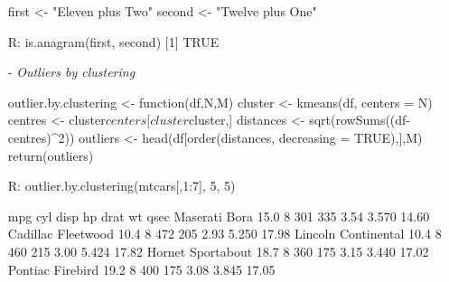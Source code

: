 \begin{itemize}
\begin{example}
first  <- "Eleven plus Two"
second <- "Twelve plus One"

R: is.anagram(first, second) 
[1] TRUE
\end{example}

\pagebreak
 \item[-] \emph{Outliers by clustering}
\begin{example}
outlier.by.clustering <- function(df,N,M){
    cluster   <- kmeans(df, centers = N)
    centres   <- cluster$centers[cluster$cluster,]
    distances <- sqrt(rowSums((df-centres)^2))
    outliers  <- head(df[order(distances, 
                      decreasing = TRUE),],M)
    return(outliers)
}

R: outlier.by.clustering(mtcars[,1:7], 5, 5)

                     mpg cyl disp  hp drat    wt  qsec
Maserati Bora       15.0   8  301 335 3.54 3.570 14.60
Cadillac Fleetwood  10.4   8  472 205 2.93 5.250 17.98
Lincoln Continental 10.4   8  460 215 3.00 5.424 17.82
Hornet Sportabout   18.7   8  360 175 3.15 3.440 17.02
Pontiac Firebird    19.2   8  400 175 3.08 3.845 17.05
\end{example}

\end{itemize}

\begin{comment}
\subsection{RXKCD}
\samp{install.packages(RXKCD)}\\
\samp{library(RXKCD)}
\bigskip

The above fetches comic strips from 
\verb+XKCD+\footnote{
\url{http://xkcd.com/}
}

\samp{R: getXKCD(which = "random")}
\begin{figure}[!h]
 \centering 
 \texttt{[image: images/xkcd]}
 \caption{XKCD strip fetched in \samp{R}} 
\end{figure}


\subsection{Colour palette}
I have used the following colour palette
(inspired from ``Solarized''%
\footnote{
\url{http://ethanschoonover.com/solarized}
})
\begin{itemize}
 \item[-] Background: \#002b36
 \item[-] Bars:       \#657b83
 \item[-] Lines:      \#2aa198, \#268bd2
\end{itemize}
\end{comment}



